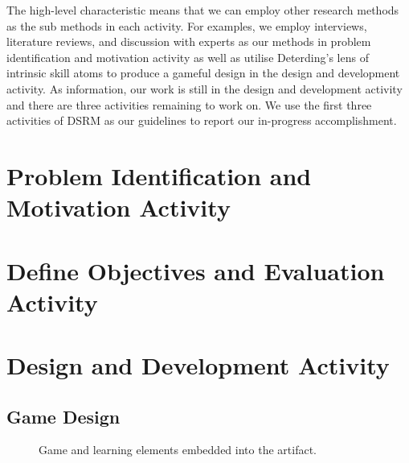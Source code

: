 \documentclass[runningheads,a4paper]{llncs}
\begin{document}
The high-level characteristic means that we can employ other research methods as the sub methods in each activity. For examples, we employ interviews, literature reviews, and discussion with experts as our methods in problem identification and motivation activity as well as utilise Deterding's lens of intrinsic skill atoms \cite{deterding2015lens} to produce a gameful design in the design and development activity. As information, our work is still in the design and development activity and there are three activities remaining to work on. We use the first three activities of DSRM as our guidelines to report our in-progress accomplishment.
 
\section{Problem Identification and Motivation Activity}

\section{Define Objectives and Evaluation Activity}

\section{Design and Development Activity}

\subsection{Game Design}

\begin{figure}[htb]
\centering
{}
\hspace*{\fill}
\caption{Game and learning elements embedded into the artifact.}
\end{figure}
\end{document}
